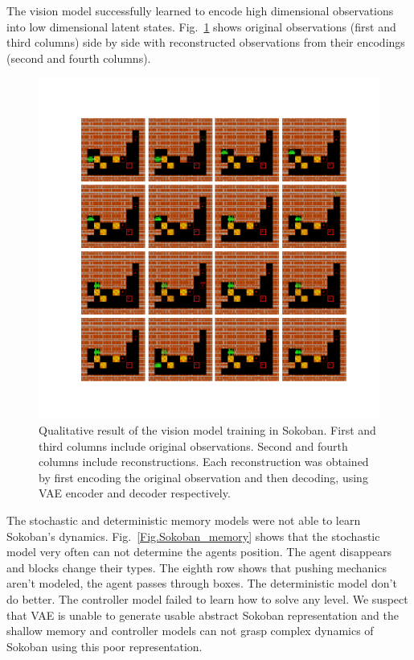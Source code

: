 The vision model successfully learned to encode high dimensional observations into low dimensional latent states. Fig.~\ref{Fig.Sokoban_vision} shows original observations (first and third columns) side by side with reconstructed observations from their encodings (second and fourth columns).

\begin{figure}[H]
\includegraphics[width=1\textwidth,keepaspectratio]{figures/Sokoban_vision.png}
\caption[Qualitative result of the vision model training in Sokoban]{Qualitative result of the vision model training in Sokoban. First and third columns include original observations. Second and fourth columns include reconstructions. Each reconstruction was obtained by first encoding the original observation and then decoding, using VAE encoder and decoder respectively.}
\label{Fig.Sokoban_vision}
\end{figure}

The stochastic and deterministic memory models were not able to learn Sokoban’s dynamics. Fig.~\ref{Fig.Sokoban_memory} shows that the stochastic model very often can not determine the agents position. The agent disappears and blocks change their types. The eighth row shows that pushing mechanics aren't modeled, the agent passes through boxes. The deterministic model don't do better.
The controller model failed to learn how to solve any level. We suspect that VAE is unable to generate usable abstract Sokoban representation and the shallow memory and controller models can not grasp complex dynamics of Sokoban using this poor representation.

